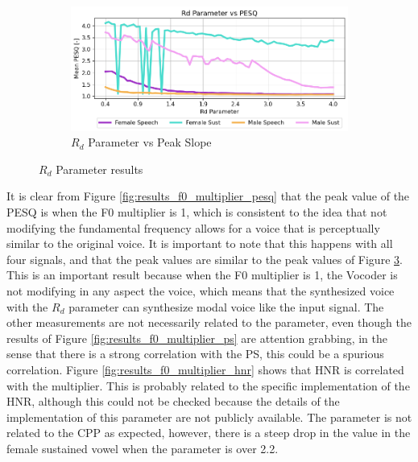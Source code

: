 \documentclass[final,5p,times,twocolumn]{elsarticle}
\begin{document}
\begin{figure}[!htpb]
{\begin{subfigure}[b]{.49\textwidth}
        \label{fig:results_rd_ps}
	\end{subfigure}
	\begin{subfigure}[b]{.49\textwidth}
		\centering
		\includegraphics[width=.98\textwidth]{rd_pesq.png}
		\caption{$R_d$ Parameter vs Peak Slope}
        \label{fig:results_rd_pesq}
	\end{subfigure}
	}
	\caption{$R_d$ Parameter results}
\end{figure}

It is clear from Figure \ref{fig:results_f0_multiplier_pesq} that the peak value of the PESQ is when the F0 multiplier is 1, which is consistent to the idea that not modifying the fundamental frequency allows for a voice that is perceptually similar to the original voice. It is important to note that this happens with all four signals, and that the peak values are similar to the peak values of Figure \ref{fig:results_rd_pesq}. This is an important result because when the F0 multiplier is 1, the Vocoder is not modifying in any aspect the voice, which means that the synthesized voice with the $R_d$ parameter can synthesize modal voice like the input signal. The other measurements are not necessarily related to the parameter, even though the results of Figure \ref{fig:results_f0_multiplier_ps} are attention grabbing, in the sense that there is a strong correlation with the PS, this could be a spurious correlation. Figure \ref{fig:results_f0_multiplier_hnr} shows that HNR is correlated with the multiplier. This is probably related to the specific implementation of the HNR, although this could not be checked because the details of the implementation of this parameter are not publicly available. The parameter is not related to the CPP as expected, however, there is a steep drop in the value in the female sustained vowel when the parameter is over 2.2.
\end{document}
